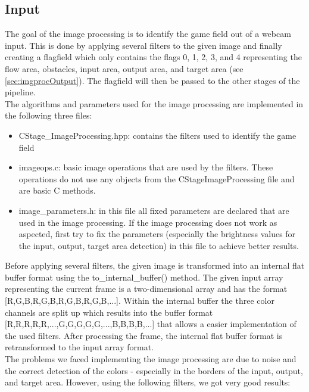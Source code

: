 
\subsection{Input}
The goal of the image processing is to identify the game field out of a webcam input. This is done by applying several filters to the given image and finally creating a flagfield which only contains the flags 0, 1, 2, 3, and 4 representing the flow area, obstacles, input area, output area, and target area (see \ref{sec:imgprocOutput}). The flagfield will then be passed to the other stages of the pipeline. \\

\noindent The algorithms and parameters used for the image processing are implemented in the following three files:
\begin{itemize}
	\item CStage\_ImageProcessing.hpp: contains the filters used to identify the game field
	\item imageops.c: basic image operations that are used by the filters. These operations do not use any objects from the CStageImageProcessing file and are basic C methods. 
	\item image\_parameters.h: in this file all fixed parameters are declared that are used in the image processing. If the image processing does not work as aspected, first try to fix the parameters (especially the brightness values for the input, output, target area detection) in this file to achieve better results.
\end{itemize}

\noindent Before applying several filters, the given image is transformed into an internal flat buffer format using the to\_internal\_buffer() method. The given input array representing the current frame is a two-dimensional array and has the format [R,G,B,R,G,B,R,G,B,R,G,B,...]. Within the internal buffer the three color channels are split up which results into the buffer format [R,R,R,R,R,...,G,G,G,G,G,...,B,B,B,B,...] that allows a easier implementation of the used filters. After processing the frame, the internal flat buffer format is retransformed to the input array format. \\

\noindent The problems we faced implementing the image processing are due to noise and the correct detection of the colors - especially in the borders of the input, output, and target area. However, using the following filters, we got very good results:

